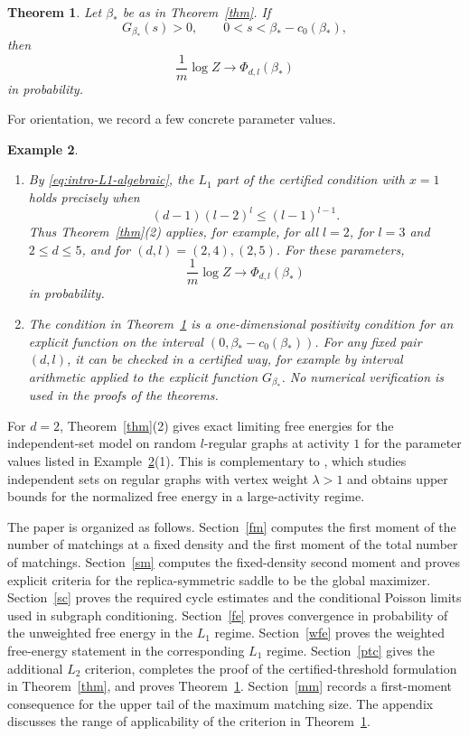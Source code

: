 \documentclass[11pt]{amsart}
\theoremstyle{plain}
\newtheorem{theorem}{Theorem}
\newtheorem{example}[theorem]{Example}
\numberwithin{equation}{section}
\numberwithin{theorem}{section}
\numberwithin{figure}{section}
\begin{document}
\begin{theorem}\label{th12}
Let $\beta_*$ be as in Theorem~\ref{thm}.  If
\[
  G_{\beta_*}(s)>0,
  \qquad 0<s<\beta_*-c_0(\beta_*),
\]
then
\begin{equation}\label{czp}
  \frac1m\log Z\longrightarrow \Phi_{d,l}(\beta_*)
\end{equation}
in probability.
\end{theorem}

For orientation, we record a few concrete parameter values.

\begin{example}\label{ex:main-examples}
\begin{enumerate}
\item By \eqref{eq:intro-L1-algebraic}, the $L_1$ part of the certified condition
with $x=1$ holds precisely when
\[
  (d-1)(l-2)^l\le (l-1)^{l-1}.
\]
Thus Theorem~\ref{thm}(2) applies, for example, for all $l=2$, for
$l=3$ and $2\le d\le5$, and for $(d,l)=(2,4),(2,5)$.
For these parameters,
\[
  \frac1m\log Z\longrightarrow \Phi_{d,l}(\beta_*)
\]
in probability.

\item The condition in Theorem~\ref{th12} is a one-dimensional positivity
condition for an explicit function on the interval
$(0,\beta_*-c_0(\beta_*))$.  For any fixed pair $(d,l)$, it can be checked in a
certified way, for example by interval arithmetic applied to the explicit
function $G_{\beta_*}$.  No numerical verification is used in the proofs of the
theorems.
\end{enumerate}
\end{example}

For $d=2$, Theorem~\ref{thm}(2) gives exact limiting free energies for the
independent-set model on random $l$-regular graphs at activity $1$ for the
parameter values listed in Example~\ref{ex:main-examples}(1).  This is
complementary to \cite{LO18}, which studies independent sets on regular graphs
with vertex weight $\lambda>1$ and obtains upper bounds for the normalized free
energy in a large-activity regime.

The paper is organized as follows.  Section~\ref{fm} computes the first moment of
the number of matchings at a fixed density and the first moment of the total
number of matchings.  Section~\ref{sm} computes the fixed-density second moment
and proves explicit criteria for the replica-symmetric saddle to be the global
maximizer.  Section~\ref{sc} proves the required cycle estimates and the
conditional Poisson limits used in subgraph conditioning.  Section~\ref{fe}
proves convergence in probability of the unweighted free energy in the $L_1$
regime.  Section~\ref{wfe} proves the weighted free-energy statement in the
corresponding $L_1$ regime.  Section~\ref{ptc} gives the additional $L_2$
criterion, completes the proof of the certified-threshold formulation in
Theorem~\ref{thm}, and proves Theorem~\ref{th12}.
Section~\ref{mm} records a first-moment consequence for the upper tail of the
maximum matching size.  The appendix discusses the range of applicability of the
criterion in Theorem~\ref{th12}.
\end{document}
